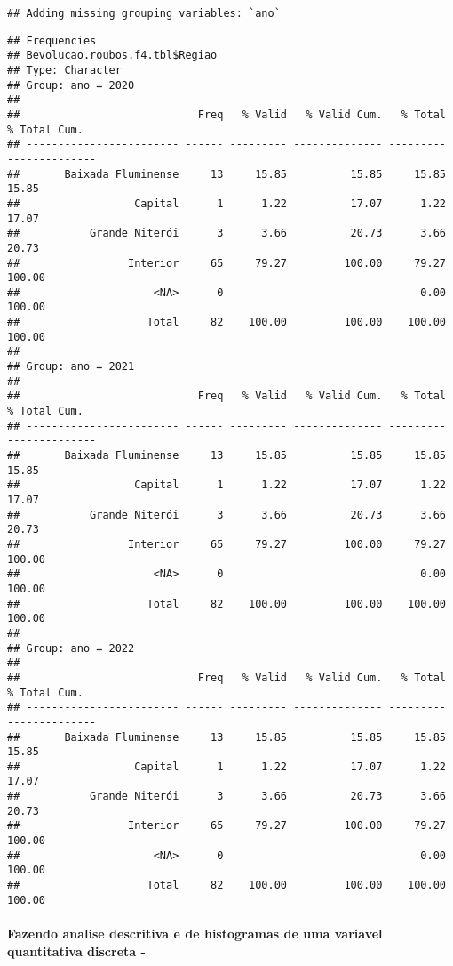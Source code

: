 \documentclass[
]{article}
\begin{document}
\begin{verbatim}
## Adding missing grouping variables: `ano`
\end{verbatim}

\begin{verbatim}
## Frequencies  
## Bevolucao.roubos.f4.tbl$Regiao  
## Type: Character  
## Group: ano = 2020  
## 
##                            Freq   % Valid   % Valid Cum.   % Total   % Total Cum.
## ------------------------ ------ --------- -------------- --------- --------------
##       Baixada Fluminense     13     15.85          15.85     15.85          15.85
##                  Capital      1      1.22          17.07      1.22          17.07
##           Grande Niterói      3      3.66          20.73      3.66          20.73
##                 Interior     65     79.27         100.00     79.27         100.00
##                     <NA>      0                               0.00         100.00
##                    Total     82    100.00         100.00    100.00         100.00
## 
## Group: ano = 2021  
## 
##                            Freq   % Valid   % Valid Cum.   % Total   % Total Cum.
## ------------------------ ------ --------- -------------- --------- --------------
##       Baixada Fluminense     13     15.85          15.85     15.85          15.85
##                  Capital      1      1.22          17.07      1.22          17.07
##           Grande Niterói      3      3.66          20.73      3.66          20.73
##                 Interior     65     79.27         100.00     79.27         100.00
##                     <NA>      0                               0.00         100.00
##                    Total     82    100.00         100.00    100.00         100.00
## 
## Group: ano = 2022  
## 
##                            Freq   % Valid   % Valid Cum.   % Total   % Total Cum.
## ------------------------ ------ --------- -------------- --------- --------------
##       Baixada Fluminense     13     15.85          15.85     15.85          15.85
##                  Capital      1      1.22          17.07      1.22          17.07
##           Grande Niterói      3      3.66          20.73      3.66          20.73
##                 Interior     65     79.27         100.00     79.27         100.00
##                     <NA>      0                               0.00         100.00
##                    Total     82    100.00         100.00    100.00         100.00
\end{verbatim}

\hypertarget{fazendo-analise-descritiva-e-de-histogramas-de-uma-variavel-quantitativa-discreta--}{%
\paragraph{Fazendo analise descritiva e de histogramas de uma variavel quantitativa discreta -}\label{fazendo-analise-descritiva-e-de-histogramas-de-uma-variavel-quantitativa-discreta--}}
\end{document}
